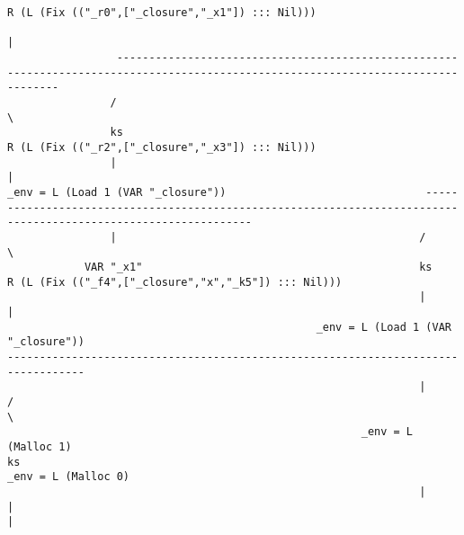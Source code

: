 \begin{landscape}
\begin{lstlisting}[basicstyle=\fontsize{5.5}{6.5}\selectfont\ttfamily]
                                                                                                           R (L (Fix (("_r0",["_closure","_x1"]) ::: Nil)))
                                                                                                                                  |
                 -----------------------------------------------------------------------------------------------------------------------------------
                /                                                                                                                                   \
                ks                                                                                                           R (L (Fix (("_r2",["_closure","_x3"]) ::: Nil)))
                |                                                                                                                                   |
_env = L (Load 1 (VAR "_closure"))                               -----------------------------------------------------------------------------------------------------------------
                |                                               /                                                                                                                 \
            VAR "_x1"                                           ks                                                                                       R (L (Fix (("_f4",["_closure","x","_k5"]) ::: Nil)))
                                                                |                                                                                                                 |
                                                _env = L (Load 1 (VAR "_closure"))                                                                  ----------------------------------------------------------------------------------
                                                                |                                                                                  /                                                                                  \
                                                       _env = L (Malloc 1)                                                                         ks                                                                        _env = L (Malloc 0)
                                                                |                                                                                  |                                                                                  |

\end{lstlisting}
\end{landscape}
